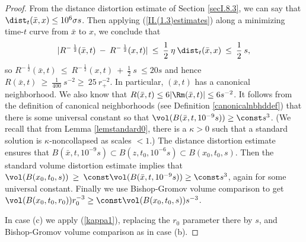 \begin{proof}
From the distance distortion estimate of Section \ref{secI.8.3},
we can say that $\dist_{t} (\bar x, x) \le 10^6 \sigma s$.
Then applying (\ref{II.(1.3)estimates}) along a minimizing
time-$t$ curve from $\bar x$ to $x$, we conclude that
\begin{equation}
|R^{- \: \frac12}(\bar x, t) \: - \: R^{- \: \frac12}(x, t)| \: \le \:
\frac12 \: \eta \: \dist_{t} (\bar x, x) \: \le \: \frac12 \: s,
\end{equation}
so $R^{- \: \frac12}(\bar x, t) \: \le \:
R^{- \: \frac12}(x, t) \: + \: \frac12 \: s \: \le 20s$ and hence
$R(\bar x, t) \: \ge \: \frac{1}{400} \: s^{-2} \ge \: 25 \: r_+^{-2}$.
In particular, $(\bar x,t)$ has a canonical neighborhood.
We also know that $R(\bar x, t) \le 6 |\Rm (\bar x, t)| \le 6 s^{-2}$.
It follows from the definition of canonical neighborhoods
(see Definition \ref{canonicalnbhddef}) that
there is some universal constant so that
$\vol(B(\bar x,t,10^{-9}s) ) \ge \const s^3$.
(We recall that from Lemma \ref{lemstandard0},
there is a $\kappa>0$ such that a standard solution
is $\kappa$-noncollapsed as scales $<1$.)
The distance distortion
estimate ensures that $B(\bar x,t,10^{-9}s) \subset
B(z,t_0,10^{-6}s) \subset B(x_0,t_0,s)$. Then the standard volume
distortion estimate implies that
$\vol(B(x_0,t_0,s)) \: \ge \: \const
\vol(B(\bar x,t,10^{-9}s) ) \ge \const s^3$,
again for some universal constant.
Finally we use Bishop-Gromov volume comparison to get
$\vol(B(x_0,t_0,r_0))r_0^{-3}\geq \const \vol(B(x_0,t_0,s))s^{-3}$.

In case (c) we apply (\ref{kappa1}), replacing the
$r_0$ parameter there by $s$, and Bishop-Gromov
volume comparison as in case (b).
\end{proof}
